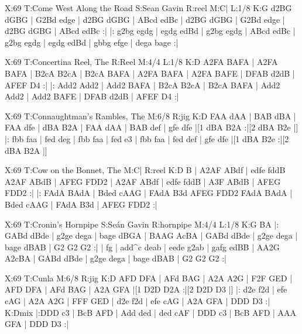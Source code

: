 \documentclass{article}
\begin{document}
\begin{abc}[name]
X:69
T:Come West Along the Road
S:Sean Gavin
R:reel
M:C|
L:1/8
K:G
d2BG dGBG | G2Bd edge | d2BG dGBG | ABcd edBc |
d2BG dGBG | G2Bd edge | d2BG dGBG | ABcd edBc :|
|: g2bg egdg | egdg edBd | g2bg egdg | ABcd edBc |
g2bg egdg | egdg edBd | gbbg efge | dega bage :|
\end{abc}

\begin{abc}[name]
X:69
T:Concertina Reel, The
R:Reel
M:4/4
L:1/8
K:D
A2FA BAFA | A2FA BAFA | B2cA B2cA | B2cA BAFA |
A2FA BAFA | A2FA BAFE | DFAB d2dB | AFEF D4 :|
|: Add2 Add2 | Add2 BAFA | B2cA B2cA | B2cA BAFA |
Add2 Add2 | Add2 BAFE | DFAB d2dB | AFEF D4 :|
\end{abc}

\begin{abc}[name]
X:69
T:Connaughtman's Rambles, The
M:6/8
R:jig
K:D
FAA dAA | BAB dBA | FAA dfe | dBA B2A |
FAA dAA | BAB def | gfe dfe |[1 dBA B2A :|[2 dBA B2e |]
|: fbb faa | fed deg | fbb faa | fed e3 |
fbb faa | fed def | gfe dfe |[1 dBA B2e :|[2 dBA B2A |]
\end{abc}

\begin{abc}[name]
X:69
T:Cow on the Bonnet, The
M:C|
R:reel
K:D
B | A2AF ABdf | edfe fddB A2AF ABdB | AFEG FDD2 |
A2AF ABdf | edfe fddB | A3F ABdB | AFEG FDD2 :|
|: FAdA BAdA | Bded cAAG | FAdA B3d AFEG FDD2
FAdA BAdA | Bded cAAG | FAdA B3d | AFEG FDD2 :|
\end{abc}

\begin{abc}[name]
X:69
T:Cronin's Hornpipe
S:Seán Gavin
R:hornpipe
M:4/4
L:1/8
K:G
BA |: GABd dBde | g2ge dega | bage dBGA | BAAG AcBA |
GABd dBde | g2ge dega | bage dBAB | G2 G2 G2 :|
| fg | add^c deab | eede g2ab | gafg edBB | AA2G A2cBA |
GABd dBde | g2ge dega | bage dBAB | G2 G2 G2 :|
\end{abc}

\begin{abc}[name]
X:69
T:Cunla
M:6/8
R:jig
K:D
AFD DFA | AFd BAG | A2A A2G | F2F GED |
AFD DFA | AFd BAG | A2A GFA |[1 D2D D2A :|[2 D2D D3 |]
|: d2e f2d | efe cAG | A2A A2G | FFF GED |
d2e f2d | efe cAG | A2A GFA | DDD D3 :|
K:Dmix
|:DDD c3 | BcB AFD | Add ded | ded cAF |
DDD c3 | BcB AFD | AAA GFA | DDD D3 :|
\end{abc}
\end{document}
